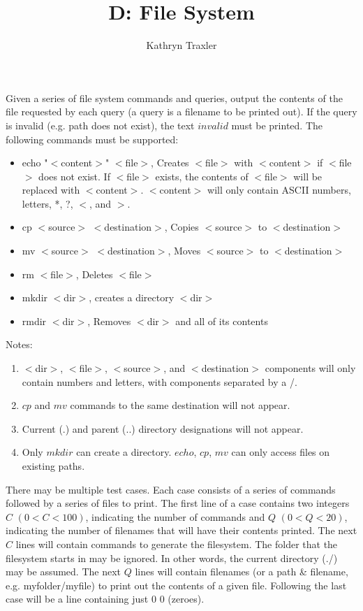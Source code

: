 \documentclass{article}
\title{D: File System}
\author{Kathryn Traxler}
\begin{document}
\begin{problemDescription}
Given a series of file system commands and queries, output the contents of the file 
requested by each query (a query is a filename to be printed out). If the query 
is invalid (e.g. path does not exist), the text $invalid$ must be printed.
The following commands must be supported:

\begin{itemize}
\item echo "$<$content$>$" $<$file$>$, Creates $<$file$>$ with $<$content$>$ if 
  $<$file$>$ does not 
   exist. If $<$file$>$ exists, the contents of $<$file$>$ will be replaced 
   with $<$content$>$. 
   $<$content$>$ will only contain ASCII numbers, letters, *, ?, $<$, and $>$.
\item cp $<$source$>$ $<$destination$>$, Copies $<$source$>$ to $<$destination$>$
\item mv $<$source$>$ $<$destination$>$, Moves $<$source$>$ to $<$destination$>$
\item rm $<$file$>$, Deletes $<$file$>$
\item mkdir $<$dir$>$, creates a directory $<$dir$>$
\item rmdir $<$dir$>$, Removes $<$dir$>$ and all of its contents
\end{itemize}

Notes:
\begin{enumerate}
\item $<$dir$>$, $<$file$>$, $<$source$>$, and $<$destination$>$ components will only contain 
numbers and letters, with components separated by a /.
\item $cp$ and $mv$ commands to the same destination will not appear. 
\item Current (.) and parent (..) directory designations will not appear. 
\item Only $mkdir$ can create a directory.  $echo$, $cp$, $mv$ can only access files
on existing paths.
\end{enumerate}

\end{problemDescription}

\begin{inputDescription}
There may be multiple test cases.  Each case consists of a series of commands
followed by a series of files to print.  The first line of a case contains two
integers $C$ $(0 < C < 100)$, indicating the number of commands and
 $Q$ $(0 < Q < 20)$, indicating the number of filenames that will have their 
contents printed.  The next $C$ lines will contain commands to generate the filesystem. 
The folder that the filesystem starts in may be ignored. In other words, the current directory 
(./) may be assumed.  The next $Q$ lines will contain filenames (or a path \& filename, 
e.g. myfolder/myfile) to print out the contents of a given file.  Following the last
case will be a line containing just 0 0 (zeroes).
\end{inputDescription}
\end{document}

